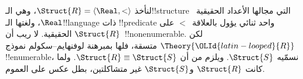 \documentclass[../../../include/open-logic-section]{subfiles}
\begin{document}
\begin{rem}
  لنأخذ $\Struct{R} = \langle\Real, <\rangle$، وهي الـ!!{structure}
  التي مجالها الأعداد الحقيقية~$\Real$، ولغتها الـ!!{language}
  ذات !!{predicate} واحد ثنائي يؤول بالعلاقة~$<$ على الحقيقية.
  لا ريب أن $\Struct{R}$~!!{nonenumerable}. لكن $\Theory{{\OLId{latin-looped}{R}}}$
  متسقة، فلها بمبرهنة لوفنهايم--سكولم نموذج !!{enumerable}،
  نسمّيه $\Struct{S}$. ويلزم من  أن
  $\Struct{R} \equiv \Struct{S}$. ولما كانت $\Struct{R}$
  و$\Struct{S}$ غير متشاكلتين، بطل عكس 
  على العموم.
\end{rem}
\end{document}
